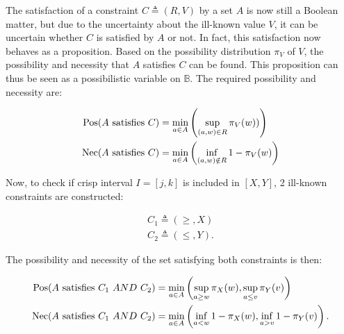 The satisfaction of a constraint $C \triangleq (R,V)$ by a set $A$ is now still a Boolean matter, but due to the uncertainty about the ill-known value $V$, it can be uncertain whether $C$ is satisfied by $A$ or not\cite{Pon11}. In fact, this satisfaction now behaves as a proposition. Based on the possibility distribution $\pi_{V}$ of $V$, the possibility and necessity that $A$ satisfies $C$ can be found. This proposition can thus be seen as a possibilistic variable on $\mathbb{B}$. The required possibility and necessity are:

\begin{align}
\operatorname{Pos}(A\text{ satisfies }C) & = \min_{a \in A}\left(\sup_{(a,w) \in R}\pi_{V}(w))\right) \\
\operatorname{Nec}(A\text{ satisfies }C) & = \min_{a \in A}\left(\inf_{(a,w) \notin R} 1-\pi_{V}(w)\right)
\end{align}

Now, to check if crisp interval $I = \left[j, k\right]$ is included in $\left[X, Y\right]$, 2 ill-known constraints are constructed:


\begin{eqnarray}
C_1\triangleq\left(\geq,X\right)\\
C_2\triangleq\left(\leq,Y\right).
\end{eqnarray}

The possibility and necessity of the set satisfying both constraints is then:

\begin{align}
\label{eq:interval-pos}
\operatorname{Pos}(A\text{ satisfies }C_1\ AND\ C_2) & = \min_{a \in A}\left(\sup_{a \geq w}\pi_{X}(w),\sup_{a \leq v}\pi_{Y}(v)\right)\\
\label{eq:interval-nec}
\operatorname{Nec}(A\text{ satisfies }C_1\ AND\ C_2) & = \min_{a \in A}\left(\inf_{a < w} 1-\pi_{X}(w),\inf_{a > v} 1-\pi_{Y}(v)\right).
\end{align}

